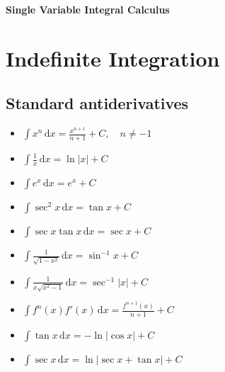 \documentclass[11pt,a4paper,fleqn]{article}
\newcommand{\dd}{\,\mathrm{d}}
\newenvironment{integrallist}
  {\begin{itemize}[
      label=\(\bullet\),
      leftmargin=1.65em,
      labelsep=0.55em,
      itemsep=0.55em,
      topsep=0.15em,
      parsep=0pt,
      partopsep=0pt
    ]}
  {\end{itemize}}
\begin{document}
\begin{center}
  {\fontsize{19}{22}\selectfont\bfseries Single Variable Integral Calculus}\par
\end{center}

\section*{Indefinite Integration}

\subsection*{Standard antiderivatives}

\noindent
\begin{minipage}[t]{0.485\textwidth}
\vspace{0pt}
\begin{integrallist}
\item \(\displaystyle
      \int x^n\dd x=\frac{x^{n+1}}{n+1}+C,\quad n\ne-1\)
\item \(\displaystyle
      \int \frac{1}{x}\dd x=\ln|x|+C\)
\item \(\displaystyle
      \int e^x\dd x=e^x+C\)
\item \(\displaystyle
      \int \sec^2x\dd x=\tan x+C\)
\item \(\displaystyle
      \int \sec x\tan x\dd x=\sec x+C\)
\item \(\displaystyle
      \int \frac{1}{\sqrt{1-x^2}}\dd x=\sin^{-1}x+C\)
\item \(\displaystyle
      \int \frac{1}{x\sqrt{x^2-1}}\dd x=\sec^{-1}|x|+C\)
\item \(\displaystyle
      \int f^n(x) f'(x)\dd x
      =\frac{f^{n+1}(x)}{n+1}+C\)
\item \(\displaystyle
      \int \tan x\dd x=-\ln|\cos x|+C\)
\item \(\displaystyle
      \int \sec x\dd x=\ln|\sec x+\tan x|+C\)
\end{integrallist}
\end{minipage}
\hfill
\end{document}
